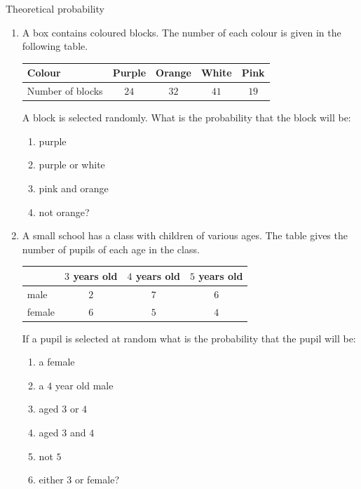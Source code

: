 \begin{exercises}{Theoretical probability}\noindent
  \begin{enumerate}[itemsep=5pt, label=\textbf{\arabic*}. ]
  \item A box contains coloured blocks. The number of each colour is
    given in the following table.

    \begin{center}
      \begin{tabular}{lcccc}
        \toprule
        Colour & Purple & Orange & White & Pink \\
        \midrule
        Number of blocks & $24$ & $32$ & $41$ & $19$ \\
        \bottomrule
      \end{tabular}
    \end{center}

    A block is selected randomly. What is the probability that the block will be:
    \begin{enumerate}
    \item purple
    \item purple or white
    \item pink and orange
    \item not orange?
    \end{enumerate}

  \item A small school has a class with children of various ages. The
    table gives the number of pupils of each age in the class.

    \begin{center}
      \begin{tabular}{lccc}
        \toprule
               & $3$ years old & $4$ years old & $5$ years old \\
       \midrule
        male   & $2$ & $7$ & $6$ \\
        female & $6$ & $5$ & $4$ \\
        \bottomrule
      \end{tabular}
    \end{center}

    If a pupil is selected at random what is the probability that the
    pupil will be:
    \begin{enumerate}
    \item a female
    \item a $4$ year old male
    \item aged $3$ or $4$
    \item aged $3$ and $4$
    \item not $5$
    \item either $3$ or female?
    \end{enumerate}


\end{enumerate}
\end{exercises}

